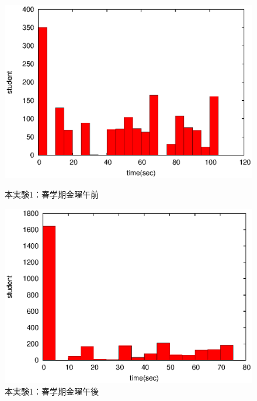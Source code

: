 \documentclass[a4paper,10pt]{jarticle}
\begin{document}
\begin{figure}[htpb]                        
\begin{minipage} {0.5\hsize}                             
\begin{center}                              
\includegraphics[bb=0 0 390 248,clip,width=\hsize]{oFr12_hist.eps}   
\caption{本実験1：春学期金曜午前}                              
\label{oFr12}                                
\end{center}                                    
\end{minipage}                                 
\begin{minipage}{0.5\hsize}                                            
\begin{center}                              
\includegraphics[bb=0 0 390 248,clip,width=\hsize]{oFr345_hist.eps}   
\caption{本実験1：春学期金曜午後}                              
\label{oFr345}                                
\end{center}                                    
\end{minipage}                                 
\end{figure}                                 
\end{document}
